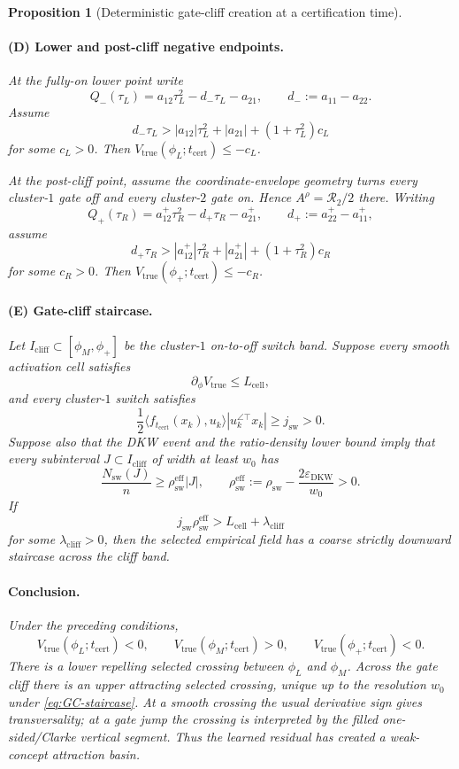 \documentclass{article} %
\theoremstyle{plain}
\newtheorem{proposition}[theorem]{Proposition}
\theoremstyle{definition}
\theoremstyle{remark}
\begin{document}
\begin{proposition}[Deterministic gate-cliff creation at a certification time]
\paragraph{(D) Lower and post-cliff negative endpoints.}
At the fully-on lower point write
\[
Q_-(\tau_L)
=
a_{12}\tau_L^2-d_-\tau_L-a_{21},
\qquad
d_-:=a_{11}-a_{22}.
\]
Assume
\[
\boxed{
d_-\tau_L
>
|a_{12}|\tau_L^2+|a_{21}|+(1+\tau_L^2)c_L
}
\tag{GC-left}\label{eq:GC-left}
\]
for some $c_L>0$.  Then
$V_{\mathrm{true}}(\phi_L;t_{\mathrm{cert}})\le-c_L$.

At the post-cliff point, assume the coordinate-envelope geometry turns every
cluster-$1$ gate off and every cluster-$2$ gate on.  Hence
$A^\rho=\mathcal R_2/2$ there.  Writing
\[
Q_+(\tau_R)
=
a_{12}^+\tau_R^2-d_+\tau_R-a_{21}^+,
\qquad
d_+:=a_{22}^+-a_{11}^+,
\]
assume
\[
\boxed{
d_+\tau_R
>
|a_{12}^+|\tau_R^2+|a_{21}^+|+(1+\tau_R^2)c_R
}
\tag{GC-right}\label{eq:GC-right}
\]
for some $c_R>0$.  Then
$V_{\mathrm{true}}(\phi_+;t_{\mathrm{cert}})\le-c_R$.

\paragraph{(E) Gate-cliff staircase.}
Let $I_{\mathrm{cliff}}\subset[\phi_M,\phi_+]$ be the cluster-$1$
on-to-off switch band.  Suppose every smooth activation cell satisfies
\[
\partial_\phi V_{\mathrm{true}}\le L_{\mathrm{cell}},
\]
and every cluster-$1$ switch satisfies
\[
\frac12
\langle f_{t_{\mathrm{cert}}}(x_k),u_k\rangle
|u_k^{\angle\top}x_k|
\ge j_{\mathrm{sw}}>0.
\]
Suppose also that the DKW event and the ratio-density lower bound imply that
every subinterval $J\subset I_{\mathrm{cliff}}$ of width at least $w_0$
has
\[
\frac{N_{\mathrm{sw}}(J)}{n}
\ge
\rho_{\mathrm{sw}}^{\mathrm{eff}}|J|,
\qquad
\rho_{\mathrm{sw}}^{\mathrm{eff}}
:=
\rho_{\mathrm{sw}}
-
\frac{2\varepsilon_{\mathrm{DKW}}}{w_0}>0.
\]
If
\[
\boxed{
j_{\mathrm{sw}}\rho_{\mathrm{sw}}^{\mathrm{eff}}
>
L_{\mathrm{cell}}+\lambda_{\mathrm{cliff}}
}
\tag{GC-staircase}\label{eq:GC-staircase}
\]
for some $\lambda_{\mathrm{cliff}}>0$, then the selected empirical field has
a coarse strictly downward staircase across the cliff band.

\paragraph{Conclusion.}
Under the preceding conditions,
\[
\boxed{
V_{\mathrm{true}}(\phi_L;t_{\mathrm{cert}})<0,
\qquad
V_{\mathrm{true}}(\phi_M;t_{\mathrm{cert}})>0,
\qquad
V_{\mathrm{true}}(\phi_+;t_{\mathrm{cert}})<0.
}
\tag{GC-three-signs}\label{eq:GC-three-signs}
\]
There is a lower repelling selected crossing between $\phi_L$ and $\phi_M$.
Across the gate cliff there is an upper attracting selected crossing, unique
up to the resolution $w_0$ under \eqref{eq:GC-staircase}.  At a smooth
crossing the usual derivative sign gives transversality; at a gate jump the
crossing is interpreted by the filled one-sided/Clarke vertical segment.
Thus the learned residual has created a weak-concept attraction basin.
\end{proposition}
\end{document}
